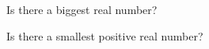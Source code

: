 \begin{question}
 \item Is there a biggest real number?
 \item Is there a smallest positive real number?
\end{question}